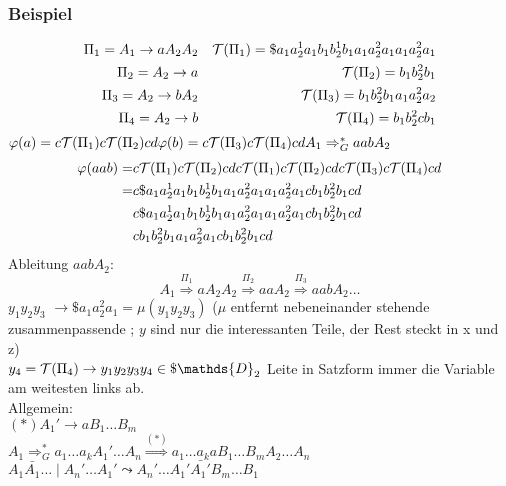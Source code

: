         \subsubsection{Beispiel}
            \begin{align*}
                \Pi_1=A_1\rightarrow aA_2A_2 && \mathcal{T}(\Pi_1)=\$a_1a_2^1a_1b_1b_2^1b_1a_1a_2^2a_1a_1a_2^2a_1\\
                \Pi_2=A_2\rightarrow a && \mathcal{T}(\Pi_2)=b_1b_2^2b_1\\
                \Pi_3=A_2\rightarrow bA_2 && \mathcal{T}(\Pi_3)=b_1b_2^2b_1a_1a_2^2a_2\\
                \Pi_4=A_2\rightarrow b && \mathcal{T}(\Pi_4)=b_1b_2^2c b_1
            \end{align*}
            $\varphi(a) = c\mathcal{T}(\Pi_1)c\mathcal{T}(\Pi_2)cd\\
            \varphi(b) = c\mathcal{T}(\Pi_3)c\mathcal{T}(\Pi_4)cd\\
            A_1\Rightarrow_G^* aabA_2$\\
            \begin{align*}
                \varphi(aab) =& c\mathcal{T}(\Pi_1)c\mathcal{T}(\Pi_2)cdc\mathcal{T}(\Pi_1)c\mathcal{T}(\Pi_2)cdc\mathcal{T}(\Pi_3)c\mathcal{T}(\Pi_4)cd\\
                =& c\$a_1a_2^1a_1b_1b_2^1b_1a_1a_2^2a_1a_1a_2^2a_1cb_1b_2^2b_1cd\\
                &c\$a_1a_2^1a_1b_1b_2^1b_1a_1a_2^2a_1a_1a_2^2a_1cb_1b_2^2b_1cd\\
                &cb_1b_2^2b_1a_1a_2^2a_1cb_1b_2^2b_1cd
            \end{align*}
            Ableitung $aabA_2$:\\
            $$A_1\overset{\Pi_1}{\Rightarrow}aA_2A_2\overset{\Pi_2}{\Rightarrow}aaA_2\overset{\Pi_3}{\Rightarrow}aabA_2\dots$$
            $y_1y_2y_3$ $\rightarrow \$a_1a_2^2a_1=\mu(y_1y_2y_3)$ ($\mu$ entfernt nebeneinander stehende zusammenpassende ; $y$ sind nur die interessanten Teile, der Rest steckt in x und z)\\
            $y_4=\Tau(\Pi_4)\rightarrow y_1y_2y_3y_4\in\$\mathds{D}_2$
            Leite in Satzform immer die Variable am weitesten links ab.\\
            Allgemein:\\
            $(*) A_1'\rightarrow aB_1\dots B_m$\\
            $A_1\Rightarrow_G^* a_1\dots a_kA_1'\dots A_n \overset{(*)}{\Rightarrow} a_1\dots a_kaB_1\dots B_mA_2\dots A_n$\\
            $A_1\bar{A_1}\dots \mid A_n'\dots A_1'\leadsto A_n'\dots A_1'\bar{A_1'}B_m\dots B_1$
